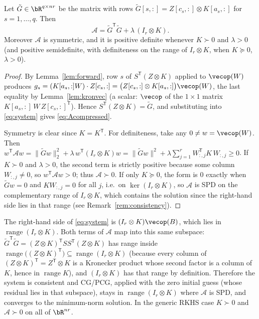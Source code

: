 \begin{lemma}\label{lem:compressed}
Let $\tilde G\in\bR^{q\times nr}$ be the matrix with rows
$\tilde G[s,:]=Z[c_s,:]\otimes K[a_s,:]$ for $s=1,\dots,q$. Then
\begin{equation}\label{eq:Acompressed}
  \mathcal A=\tilde G^{\mathsf T}\tilde G+\lambda\,(I_r\otimes K).
\end{equation}
Moreover $\mathcal A$ is symmetric, and it is positive definite whenever $K\succ0$
and $\lambda>0$ (and positive semidefinite, with definiteness on the range of
$I_r\otimes K$, when $K\succeq0$, $\lambda>0$).
\end{lemma}
\begin{proof}
By Lemma~\ref{lem:forward}, row $s$ of $S^{\mathsf T}(Z\otimes K)$ applied to
$\vecop(W)$ produces
$g_s=(K[a_s,:]W)\cdot Z[c_s,:]=\big(Z[c_s,:]\otimes K[a_s,:]\big)\vecop(W)$, the last
equality by Lemma~\ref{lem:kronvec} (a scalar: $\vecop$ of the $1\times1$ matrix
$K[a_s,:]\,W\,Z[c_s,:]^{\mathsf T}$). Hence $S^{\mathsf T}(Z\otimes K)=\tilde G$, and
substituting into \eqref{eq:system} gives \eqref{eq:Acompressed}.

Symmetry is clear since $K=K^{\mathsf T}$. For definiteness, take any
$0\neq w=\vecop(W)$. Then
$w^{\mathsf T}\mathcal A w=\|\tilde G w\|_2^2+\lambda\,w^{\mathsf T}(I_r\otimes K)w
=\|\tilde G w\|^2+\lambda\sum_{j=1}^r W_{:,j}^{\mathsf T}K\,W_{:,j}\ge0$. If $K\succ0$
and $\lambda>0$, the second term is strictly positive because some column $W_{:,j}\neq0$,
so $w^{\mathsf T}\mathcal A w>0$; thus $\mathcal A\succ0$. If only $K\succeq0$, the form
is $0$ exactly when $\tilde G w=0$ and $KW_{:,j}=0$ for all $j$, i.e.\ on
$\ker(I_r\otimes K)$, so $\mathcal A$ is SPD on the complementary range of
$I_r\otimes K$, which contains the solution since the right-hand side lies in that
range (see Remark~\ref{rem:consistency}).
\end{proof}

\begin{remark}\label{rem:consistency}
The right-hand side of \eqref{eq:system} is $(I_r\otimes K)\vecop(B)$, which lies in
$\operatorname{range}(I_r\otimes K)$. Both terms of $\mathcal A$ map into this same
subspace: $\tilde G^{\mathsf T}\tilde G=(Z\otimes K)^{\mathsf T}SS^{\mathsf T}
(Z\otimes K)$ has range inside $\operatorname{range}\big((Z\otimes K)^{\mathsf T}\big)
\subseteq\operatorname{range}(I_r\otimes K)$ (because every column of
$(Z\otimes K)^{\mathsf T}=Z^{\mathsf T}\otimes K$ is a Kronecker product whose second
factor is a column of $K$, hence in $\operatorname{range}K$), and
$(I_r\otimes K)$ has that range by definition. Therefore the system is consistent and
CG/PCG, applied with the zero initial guess (whose residual lies in that subspace),
stays in $\operatorname{range}(I_r\otimes K)$ where $\mathcal A$ is SPD, and converges to
the minimum-norm solution. In the generic RKHS case $K\succ0$ and $\mathcal A\succ0$
on all of $\bR^{nr}$.
\end{remark}

